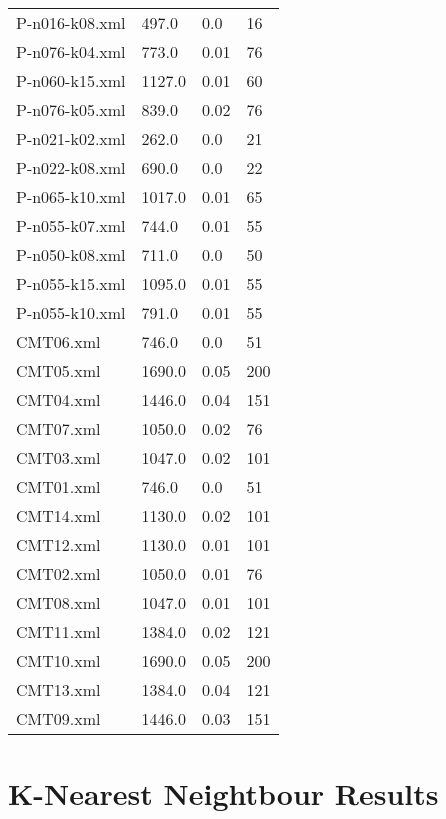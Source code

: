 \documentclass[12pt]{article}
\begin{document}
\begin{appendices}
\begin{table}[]
\begin{tabular}{llll}
	P-n016-k08.xml & 497.0 & 0.0 & 16 \\
	P-n076-k04.xml & 773.0 & 0.01 & 76 \\
	P-n060-k15.xml & 1127.0 & 0.01 & 60 \\
	P-n076-k05.xml & 839.0 & 0.02 & 76 \\
	P-n021-k02.xml & 262.0 & 0.0 & 21 \\
	P-n022-k08.xml & 690.0 & 0.0 & 22 \\
	P-n065-k10.xml & 1017.0 & 0.01 & 65 \\
	P-n055-k07.xml & 744.0 & 0.01 & 55 \\
	P-n050-k08.xml & 711.0 & 0.0 & 50 \\
	P-n055-k15.xml & 1095.0 & 0.01 & 55 \\
	P-n055-k10.xml & 791.0 & 0.01 & 55 \\
	CMT06.xml & 746.0 & 0.0 & 51 \\
	CMT05.xml & 1690.0 & 0.05 & 200 \\
	CMT04.xml & 1446.0 & 0.04 & 151 \\
	CMT07.xml & 1050.0 & 0.02 & 76 \\
	CMT03.xml & 1047.0 & 0.02 & 101 \\
	CMT01.xml & 746.0 & 0.0 & 51 \\
	CMT14.xml & 1130.0 & 0.02 & 101 \\
	CMT12.xml & 1130.0 & 0.01 & 101 \\
	CMT02.xml & 1050.0 & 0.01 & 76 \\
	CMT08.xml & 1047.0 & 0.01 & 101 \\
	CMT11.xml & 1384.0 & 0.02 & 121 \\
	CMT10.xml & 1690.0 & 0.05 & 200 \\
	CMT13.xml & 1384.0 & 0.04 & 121 \\
	CMT09.xml & 1446.0 & 0.03 & 151
	\end{tabular}
	\end{table}
\newpage


\section{K-Nearest Neightbour Results}


\end{appendices}
\end{document}

